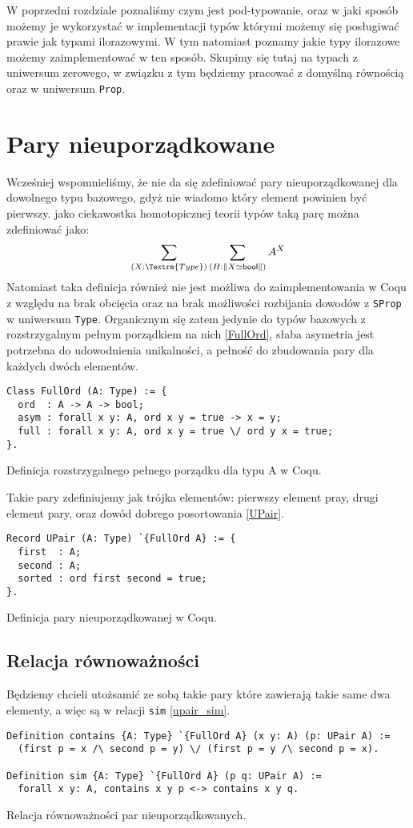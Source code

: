 W poprzedni rozdziale poznaliśmy czym jest pod-typowanie, oraz w jaki sposób możemy je wykorzystać w implementacji typów którymi możemy się posługiwać prawie jak typami ilorazowymi. W tym natomiast poznamy jakie typy ilorazowe możemy zaimplementować w ten sposób. Skupimy się tutaj na typach z uniwersum zerowego, w związku z tym będziemy pracować z domyślną równością oraz w uniwersum \texttt{Prop}.
\section{Pary nieuporządkowane}
Wcześniej wspomnieliśmy, że nie da się zdefiniować pary nieuporządkowanej dla dowolnego typu bazowego, gdyż nie wiadomo który element powinien być pierwszy. jako ciekawostka homotopicznej teorii typów taką parę można zdefiniować jako:
\begin{equation}
    \sum_{(X:\Textrm{Type})}\sum_{(H:\|X\simeq \mathsf{bool}\|)}A^X
\end{equation}
Natomiast taka definicja również nie jest możliwa do zaimplementowania w Coqu z względu na brak obcięcia oraz na brak możliwości rozbijania dowodów z \texttt{SProp} w uniwersum \texttt{Type}. Organicznym się zatem jedynie do typów bazowych z rozstrzygalnym pełnym porządkiem na nich \ref{FullOrd}, słaba asymetria jest potrzebna do udowodnienia unikalności, a pełność do zbudowania pary dla każdych dwóch elementów.
\begin{code}
\begin{verbatim}
Class FullOrd (A: Type) := {
  ord  : A -> A -> bool;
  asym : forall x y: A, ord x y = true -> x = y;
  full : forall x y: A, ord x y = true \/ ord y x = true;
}.
\end{verbatim}
\caption{Definicja rozstrzygalnego pełnego porządku dla typu A w Coqu.}
\label{FullOrd}
\end{code}
Takie pary zdefiniujemy jak trójka elementów: pierwszy element pray, drugi element pary, oraz dowód dobrego posortowania \ref{UPair}.
\begin{code}
\begin{verbatim}
Record UPair (A: Type) `{FullOrd A} := {
  first  : A;
  second : A;
  sorted : ord first second = true;
}.
\end{verbatim}
\caption{Definicja pary nieuporządkowanej w Coqu.}
\label{UPair}
\end{code}
\subsection{Relacja równoważności}
Będziemy chcieli utożsamić ze sobą takie pary które zawierają takie same dwa elementy, a więc są w relacji \texttt{sim} \ref{upair_sim}.
\begin{code}
\begin{verbatim}
Definition contains {A: Type} `{FullOrd A} (x y: A) (p: UPair A) :=
  (first p = x /\ second p = y) \/ (first p = y /\ second p = x).

Definition sim {A: Type} `{FullOrd A} (p q: UPair A) :=
  forall x y: A, contains x y p <-> contains x y q. 
\end{verbatim}
\caption{Relacja równoważności par nieuporządkowanych.}
\label{upair_sim}
\end{code}
